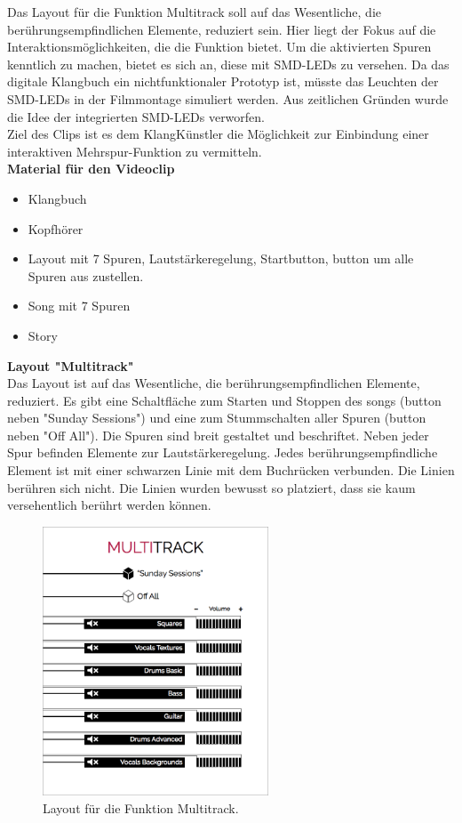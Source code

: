 Das Layout für die Funktion Multitrack soll auf das Wesentliche, die berührungsempfindlichen Elemente, reduziert sein. Hier liegt der Fokus auf die Interaktionsmöglichkeiten, die die Funktion bietet. Um die aktivierten Spuren kenntlich zu machen, bietet es sich an, diese mit SMD-LEDs zu versehen. Da das digitale Klangbuch ein nichtfunktionaler Prototyp ist, müsste das Leuchten der SMD-LEDs in der Filmmontage simuliert werden. Aus zeitlichen Gründen wurde die Idee der integrierten SMD-LEDs verworfen.\\

Ziel des Clips ist es dem KlangKünstler die Möglichkeit zur Einbindung einer interaktiven Mehrspur-Funktion zu vermitteln.\\


\textbf{Material für den Videoclip}
\begin{itemize}
\item Klangbuch
\item Kopfhörer
\item Layout mit 7 Spuren, Lautstärkeregelung, Startbutton, \gls{button} um alle Spuren aus zustellen.
\item Song mit 7 Spuren
\item Story
\end{itemize}

\vspace{0.5cm}



\textbf{Layout "Multitrack"}\\
Das Layout ist auf das Wesentliche, die berührungsempfindlichen Elemente, reduziert. Es gibt eine Schaltfläche zum Starten und Stoppen des \gls{song}s (\gls{button} neben "Sunday Sessions") und eine zum Stummschalten aller Spuren (\gls{button} neben "Off All"). Die Spuren sind breit gestaltet und beschriftet. Neben jeder Spur befinden Elemente zur Lautstärkeregelung. Jedes berührungsempfindliche Element ist mit einer schwarzen Linie mit dem Buchrücken verbunden. Die Linien berühren sich nicht. Die Linien wurden bewusst so platziert, dass sie kaum versehentlich berührt werden können.

\begin{figure}[H]
\centering
\includegraphics[width=0.6\textwidth]{grafiken/multitrack.png}
\caption{Layout für die Funktion Multitrack.}
\end{figure}

